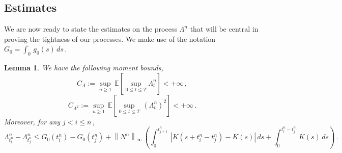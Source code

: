 \documentclass{article}
\newcommand{\1}{\mathbbm{1}}
\newtheorem{lemma}[theorem]{Lemma}
\numberwithin{equation}{section}
\begin{document}
\subsection{Estimates}
We are now ready to state the estimates on the process $\Lambda^n$ that will be central in proving the tightness of our processes. We make use of the notation $G_0 = \int_0^{\cdot}\,g_0(s)\,ds\,$.
\begin{lemma}
\label{lemma:estimates_process}
We have the following moment bounds,
\begin{equation}
\label{eq:bound_exp_Lambda}
C_{\Lambda} := \sup_{n \geq 1}\,\mathbb E \left[\sup_{0 \leq t \leq T} \Lambda^n_t\right] < + \infty\,,
\end{equation}
\begin{equation}
    \label{eq:bound_exp_Lambda_2}
    C_{\Lambda^2} := \sup_{n \geq 1}\, \mathbb E \left[ \sup_{0 \leq t \leq T}\, \left(\Lambda^n_t\right)^2\right] < + \infty\,.
\end{equation}
Moreover, for any $j < i \leq n\,$,
\begin{equation}
\label{eq:bound_variation_alpha}
\Lambda^n_{t^n_i} - \Lambda^n_{t^n_j} \leq G_0(t^n_i) - G_0(t^n_j) + \left\|N^n\right\|_{\infty}\, \left(\int_{0}^{t^n_{j+1}}\, \left|K(s + t^n_i - t^n_j) - K(s)\right|\,ds + \int_{0}^{t^n_i - t^n_j}\, K(s)\,ds\right)\,.
\end{equation}
\end{lemma}
\end{document}
